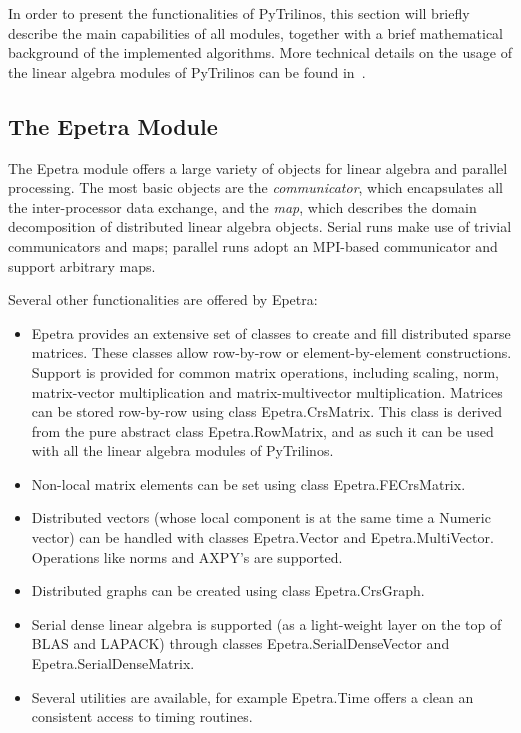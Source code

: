 \documentclass[10pt,relax]{SANDreport}
\begin{document}
In order to present the functionalities of PyTrilinos, this section
will briefly describe the main capabilities of all modules, together
with a brief mathematical background of the implemented algorithms.
More technical details on the usage of the linear algebra modules of
PyTrilinos can be found in~\cite{pytrilinos-la-guide}.

\subsection{The Epetra Module}
\label{subsec:epetra}

The Epetra module offers a large variety of objects for linear algebra and
parallel processing. The most basic objects are the
{\sl communicator}, which
  encapsulates all the inter-processor data exchange, and the
  {\sl map}, which describes the domain decomposition of
  distributed linear algebra objects. Serial runs make use of trivial
  communicators and maps; parallel runs adopt an MPI-based
  communicator and support arbitrary maps.

Several other functionalities are offered by Epetra:
\begin{itemize}
\item
Epetra provides an extensive set of classes to create and fill
distributed sparse matrices. These classes allow row-by-row or
element-by-element constructions. Support is provided for common
matrix operations, including scaling, norm, matrix-vector
multiplication and matrix-multivector multiplication.
Matrices can be stored row-by-row using
class Epetra.CrsMatrix. This class is derived from the pure abstract class
Epetra.RowMatrix, and as such it can be used with all the linear algebra
modules of PyTrilinos.
\item Non-local matrix elements can be set using class Epetra.FECrsMatrix.
\item Distributed vectors (whose local component is at the same time a
                           Numeric vector) can be handled with classes
Epetra.Vector and Epetra.MultiVector. Operations like norms and AXPY's are
supported.
\item Distributed graphs can be created using class Epetra.CrsGraph.
\item Serial dense linear algebra is supported
(as a light-weight layer on the top of BLAS and LAPACK) through
classes Epetra.SerialDenseVector and Epetra.SerialDenseMatrix.
\item Several utilities are available, for example Epetra.Time offers a clean
an consistent access to timing routines.
\end{itemize}
\end{document}
